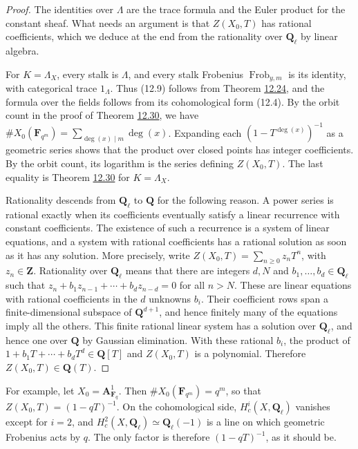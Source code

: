 \documentclass[11pt]{article}
\begin{document}
\begin{proof}[{Proof}]\label{bp321}%
The identities over \(\Lambda\) are the trace formula and the Euler product for the constant sheaf. What needs an argument is that \(Z(X_0,T)\) has rational coefficients, which we deduce at the end from the rationality over \(\mathbf Q_\ell\) by linear algebra.

For \(K=\Lambda_X\), every stalk is \(\Lambda\), and every stalk Frobenius \(\operatorname{Frob}_{y,m}\) is its identity, with categorical trace \(1_\Lambda\). Thus (12.9) follows from Theorem \hyperref[bp298]{12.24}, and the formula over the fields follows from its cohomological form (12.4). By the orbit count in the proof of Theorem \hyperref[bp317]{12.30}, we have \(\#X_0(\mathbf F_{q^m})=\sum_{\deg(x)\mid m}\deg(x)\). Expanding each \((1-T^{\deg(x)})^{-1}\) as a geometric series shows that the product over closed points has integer coefficients. By the orbit count, its logarithm is the series defining \(Z(X_0,T)\). The last equality is Theorem \hyperref[bp317]{12.30} for \(K=\Lambda_X\).

Rationality descends from \(\mathbf Q_\ell\) to \(\mathbf Q\) for the following reason. A power series is rational exactly when its coefficients eventually satisfy a linear recurrence with constant coefficients. The existence of such a recurrence is a system of linear equations, and a system with rational coefficients has a rational solution as soon as it has any solution. More precisely, write \(Z(X_0,T)=\sum_{n\geq0}z_nT^n\), with \(z_n\in\mathbf Z\). Rationality over \(\mathbf Q_\ell\) means that there are integers \(d,N\) and \(b_1,\ldots,b_d\in\mathbf Q_\ell\) such that \(z_n+b_1z_{n-1}+\cdots+b_dz_{n-d}=0\) for all \(n>N\). These are linear equations with rational coefficients in the \(d\) unknowns \(b_i\). Their coefficient rows span a finite-dimensional subspace of \(\mathbf Q^{d+1}\), and hence finitely many of the equations imply all the others. This finite rational linear system has a solution over \(\mathbf Q_\ell\), and hence one over \(\mathbf Q\) by Gaussian elimination. With these rational \(b_i\), the product of \(1+b_1T+\cdots+b_dT^d\in\mathbf Q[T]\) and \(Z(X_0,T)\) is a polynomial. Therefore \(Z(X_0,T)\in\mathbf Q(T)\).
\end{proof}

\label{bp322}%
For example, let \(X_0=\mathbf A^1_{\mathbf F_q}\). Then \(\#X_0(\mathbf F_{q^m})=q^m\), so that \(Z(X_0,T)=(1-qT)^{-1}\). On the cohomological side, \(H^i_c(X,\mathbf Q_\ell)\) vanishes except for \(i=2\), and \(H^2_c(X,\mathbf Q_\ell)\simeq\mathbf Q_\ell(-1)\) is a line on which geometric Frobenius acts by \(q\). The only factor is therefore \((1-qT)^{-1}\), as it should be.
\end{document}
